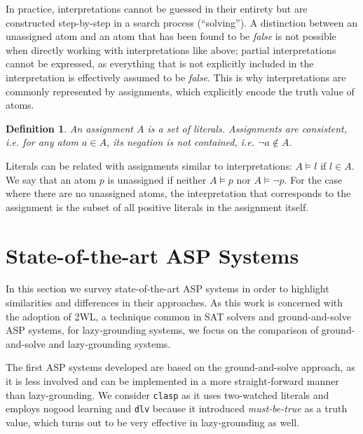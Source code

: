 \documentclass{vutinfth} %
\newtheorem{definition}{Definition}[section]
\newcommand{\mbt}{must-be-true\xspace}
\newcommand{\ass}{A}
\newcommand{\clasp}{\texttt{clasp}\xspace}
\newcommand{\dlv}{\texttt{dlv}\xspace}
\begin{document}
In practice, interpretations cannot be guessed in their entirety but are constructed step-by-step in a search process (\enquote{solving}). A distinction between an unassigned atom and an atom that has been found to be \emph{false} is not possible when directly working with interpretations like above; partial interpretations cannot be expressed, as everything that is not explicitly included in the interpretation is effectively assumed to be \emph{false}. This is why interpretations are commonly represented by assignments, which explicitly encode the truth value of atoms.

\begin{definition}
An \emph{assignment} $\ass$ is a set of literals. Assignments are consistent, i.e. for any atom $a \in \ass$, its negation is not contained, i.e. $\neg a \not \in \ass$.
\end{definition}

Literals can be related with assignments similar to interpretations: $A \models l$ if $l \in A$. We say that an atom $p$ is unassigned if neither $A \models p$ nor $A \models \neg p$. For the case where there are no unassigned atoms, the interpretation that corresponds to the assignment is the subset of all positive literals in the assignment itself.


\section{State-of-the-art ASP Systems}

In this section we survey state-of-the-art ASP systems in order to highlight similarities and differences in their approaches. As this work is concerned with the adoption of 2WL, a technique common in SAT solvers and ground-and-solve ASP systems, for lazy-grounding systems, we focus on the comparison of ground-and-solve and lazy-grounding systems.

The first ASP systems developed are based on the ground-and-solve approach, as it is less involved and can be implemented in a more straight-forward manner than lazy-grounding. We consider \clasp as it uses two-watched literals and employs nogood learning and \dlv because it introduced \emph{\mbt} as a truth value, which turns out to be very effective in lazy-grounding as well.
\end{document}
